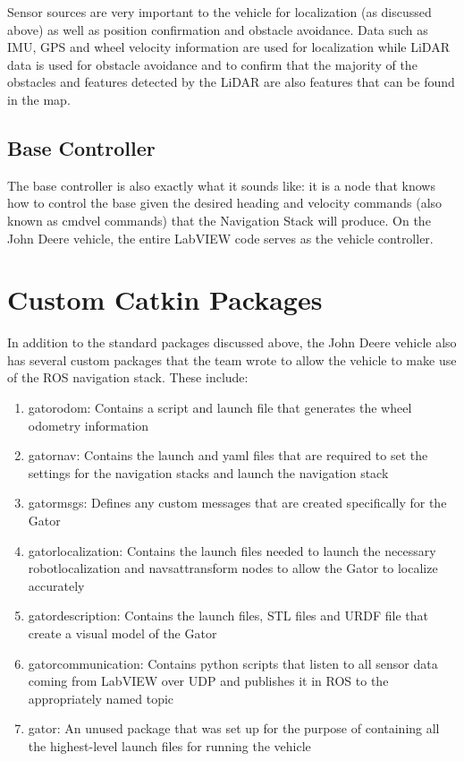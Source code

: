 Sensor sources are very important to the vehicle for localization (as discussed above) as well as position confirmation and obstacle avoidance. Data such as IMU, GPS and wheel velocity information are used for localization while LiDAR data is used for obstacle avoidance and to confirm that the majority of the obstacles and features detected by the LiDAR are also features that can be found in the map.

\subsection{Base Controller}

The base controller is also exactly what it sounds like: it is a node that knows how to control the base given the desired heading and velocity commands (also known as cmd\textunderscore vel commands) that the Navigation Stack will produce. On the John Deere vehicle, the entire LabVIEW code serves as the vehicle controller. 

\section{Custom Catkin Packages}

In addition to the standard packages discussed above, the John Deere vehicle also has several custom packages that the team wrote to allow the vehicle to make use of the ROS navigation stack.  These include:

\begin{enumerate}
\item gator\textunderscore odom: Contains a script and launch file that generates the wheel odometry information
\item gator\textunderscore nav: Contains the launch and yaml files that are required to set the settings for the navigation stacks and launch the navigation stack
\item gator\textunderscore msgs: Defines any custom messages that are created specifically for the Gator
\item gator\textunderscore localization: Contains the launch files needed to launch the necessary robot\textunderscore localization and navsat\textunderscore transform nodes to allow the Gator to localize accurately
\item gator\textunderscore description: Contains the launch files, STL files and URDF file that create a visual model of the Gator
\item gator\textunderscore communication: Contains python scripts that listen to all sensor data coming from LabVIEW over UDP and publishes it in ROS to the appropriately named topic
\item gator: An unused package that was set up for the purpose of containing all the highest-level launch files for running the vehicle
\end{enumerate}

